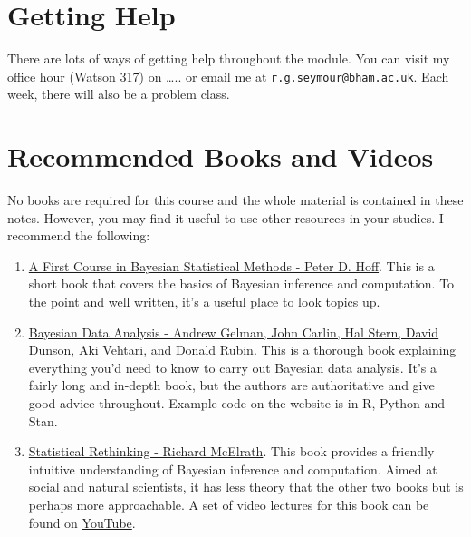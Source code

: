 \documentclass[
]{book}
\theoremstyle{definition}
\theoremstyle{definition}
\theoremstyle{definition}
\theoremstyle{definition}
\theoremstyle{remark}
\begin{document}
\hypertarget{getting-help}{%
\section{Getting Help}\label{getting-help}}

There are lots of ways of getting help throughout the module. You can visit my office hour (Watson 317) on \ldots.. or email me at \href{mailto:r.g.seymour@bham.ac.uk}{\nolinkurl{r.g.seymour@bham.ac.uk}}. Each week, there will also be a problem class.

\hypertarget{recommended-books-and-videos}{%
\section{Recommended Books and Videos}\label{recommended-books-and-videos}}

No books are required for this course and the whole material is contained in these notes. However, you may find it useful to use other resources in your studies. I recommend the following:

\begin{enumerate}
\def\labelenumi{\arabic{enumi}.}
\item
  \href{https://link.springer.com/book/10.1007/978-0-387-92407-6}{A First Course in Bayesian Statistical Methods - Peter D. Hoff}. This is a short book that covers the basics of Bayesian inference and computation. To the point and well written, it's a useful place to look topics up.
\item
  \href{http://www.stat.columbia.edu/~gelman/book/}{Bayesian Data Analysis - Andrew Gelman, John Carlin, Hal Stern, David Dunson, Aki Vehtari, and Donald Rubin}. This is a thorough book explaining everything you'd need to know to carry out Bayesian data analysis. It's a fairly long and in-depth book, but the authors are authoritative and give good advice throughout. Example code on the website is in R, Python and Stan.
\item
  \href{https://xcelab.net/rm/statistical-rethinking/}{Statistical Rethinking - Richard McElrath}. This book provides a friendly intuitive understanding of Bayesian inference and computation. Aimed at social and natural scientists, it has less theory that the other two books but is perhaps more approachable. A set of video lectures for this book can be found on \href{https://www.youtube.com/playlist?list=PLDcUM9US4XdMROZ57-OIRtIK0aOynbgZN}{YouTube}.
\end{enumerate}
\end{document}
